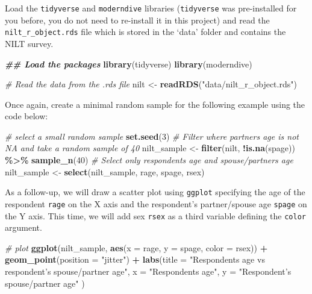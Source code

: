 \documentclass[
]{book}
\newenvironment{Shaded}{\begin{snugshade}}{\end{snugshade}}
\newcommand{\AttributeTok}[1]{\textcolor[rgb]{0.13,0.29,0.53}{#1}}
\newcommand{\CommentTok}[1]{\textcolor[rgb]{0.56,0.35,0.01}{\textit{#1}}}
\newcommand{\DecValTok}[1]{\textcolor[rgb]{0.00,0.00,0.81}{#1}}
\newcommand{\DocumentationTok}[1]{\textcolor[rgb]{0.56,0.35,0.01}{\textbf{\textit{#1}}}}
\newcommand{\FunctionTok}[1]{\textcolor[rgb]{0.13,0.29,0.53}{\textbf{#1}}}
\newcommand{\NormalTok}[1]{#1}
\newcommand{\OtherTok}[1]{\textcolor[rgb]{0.56,0.35,0.01}{#1}}
\newcommand{\SpecialCharTok}[1]{\textcolor[rgb]{0.81,0.36,0.00}{\textbf{#1}}}
\newcommand{\StringTok}[1]{\textcolor[rgb]{0.31,0.60,0.02}{#1}}
\begin{document}
Load the \texttt{tidyverse} and \texttt{moderndive} libraries (\texttt{tidyverse} was pre-installed for you before, you do not need to re-install it in this project) and read the \texttt{nilt\_r\_object.rds} file which is stored in the `data' folder and contains the NILT survey.

\begin{Shaded}
\begin{Highlighting}[]
\DocumentationTok{\#\# Load the packages}
\FunctionTok{library}\NormalTok{(tidyverse)}
\FunctionTok{library}\NormalTok{(moderndive)}

\CommentTok{\# Read the data from the .rds file}
\NormalTok{nilt }\OtherTok{\textless{}{-}} \FunctionTok{readRDS}\NormalTok{(}\StringTok{"data/nilt\_r\_object.rds"}\NormalTok{)}
\end{Highlighting}
\end{Shaded}

Once again, create a minimal random sample for the following example using the code below:

\begin{Shaded}
\begin{Highlighting}[]
\CommentTok{\# select a small random sample}
\FunctionTok{set.seed}\NormalTok{(}\DecValTok{3}\NormalTok{)}
\CommentTok{\# Filter where partner\textquotesingle{}s age is not NA and take a random sample of 40}
\NormalTok{nilt\_sample }\OtherTok{\textless{}{-}} \FunctionTok{filter}\NormalTok{(nilt, }\SpecialCharTok{!}\FunctionTok{is.na}\NormalTok{(spage)) }\SpecialCharTok{\%\textgreater{}\%} \FunctionTok{sample\_n}\NormalTok{(}\DecValTok{40}\NormalTok{)}
\CommentTok{\# Select only respondent\textquotesingle{}s age and spouse/partner\textquotesingle{}s age}
\NormalTok{nilt\_sample }\OtherTok{\textless{}{-}} \FunctionTok{select}\NormalTok{(nilt\_sample, rage, spage, rsex)}
\end{Highlighting}
\end{Shaded}

As a follow-up, we will draw a scatter plot using \texttt{ggplot} specifying the age of the respondent \texttt{rage} on the X axis and the respondent's partner/spouse age \texttt{spage} on the Y axis. This time, we will add sex \texttt{rsex} as a third variable defining the \texttt{color} argument.

\begin{Shaded}
\begin{Highlighting}[]
\CommentTok{\# plot}
\FunctionTok{ggplot}\NormalTok{(nilt\_sample,  }\FunctionTok{aes}\NormalTok{(}\AttributeTok{x =}\NormalTok{ rage, }\AttributeTok{y =}\NormalTok{ spage, }\AttributeTok{color =}\NormalTok{ rsex)) }\SpecialCharTok{+} 
  \FunctionTok{geom\_point}\NormalTok{(}\AttributeTok{position =} \StringTok{"jitter"}\NormalTok{) }\SpecialCharTok{+}
  \FunctionTok{labs}\NormalTok{(}\AttributeTok{title =} \StringTok{"Respondent\textquotesingle{}s age vs respondent’s spouse/partner age"}\NormalTok{, }
       \AttributeTok{x =} \StringTok{"Respondent\textquotesingle{}s age"}\NormalTok{, }\AttributeTok{y =} \StringTok{"Respondent’s spouse/partner age"}\NormalTok{ )}
\end{Highlighting}
\end{Shaded}
\end{document}
